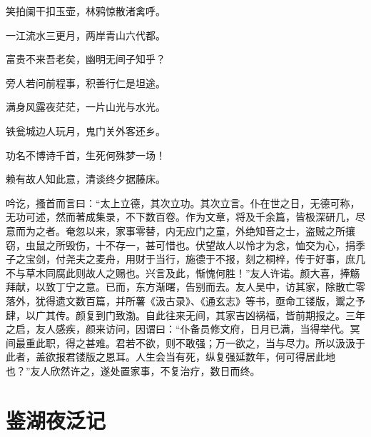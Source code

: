 \documentclass[a4paper,12pt,UTF8,twoside]{ctexbook}
\begin{document}
笑拍阑干扣玉壶，林鸦惊散渚禽呼。

一江流水三更月，两岸青山六代都。

富贵不来吾老矣，幽明无间子知乎？

旁人若问前程事，积善行仁是坦途。

满身风露夜茫茫，一片山光与水光。

铁瓮城边人玩月，鬼门关外客还乡。

功名不博诗千首，生死何殊梦一场！

赖有故人知此意，清谈终夕据藤床。

吟讫，搔首而言曰：“太上立德，其次立功。其次立言。仆在世之日，无德可称，无功可述，然而著成集录，不下数百卷。作为文章，将及千余篇，皆极深研几，尽意而为之者。奄忽以来，家事零替，内无应门之童，外绝知音之士，盗贼之所攘窃，虫鼠之所毁伤，十不存一，甚可惜也。伏望故人以怜才为念，恤交为心，捐季子之宝剑，付尧夫之麦舟，用财于当行，施德于不报，刻之桐梓，传于好事，庶几不与草木同腐此则故人之赐也。兴言及此，惭愧何胜！”友人许诺。颜大喜，捧觞拜献，以致丁宁之意。已而，东方渐曙，告别而去。友人吴中，访其家，除散亡零落外，犹得遗文数百篇，并所薯《汲古录》、《通玄志》等书，亟命工镂版，鬻之予肆，以广其传。颜复到门致渤。自此往来无间，其家吉凶祸福，皆前期报之。三年之启，友人感疾，颜来访问，因谓曰：“仆备员修文府，日月已满，当得举代。冥间最重此职，得之甚难。君若不欲，则不敢强；万一欲之，当与尽力。所以汲汲于此者，盖欲报君镂版之恩耳。人生会当有死，纵复强延数年，何可得居此地也？”友人欣然许之，遂处置家事，不复治疗，数日而终。

\chapter{鉴湖夜泛记}
\end{document}
